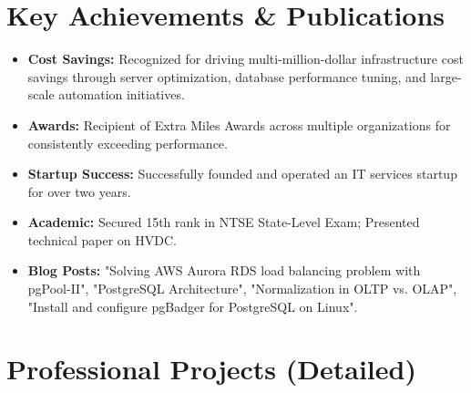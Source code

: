 \documentclass[10pt,a4paper]{article}
\begin{document}
\section{Key Achievements \& Publications}
\begin{itemize}[leftmargin=*, noitemsep]
    \item \textbf{Cost Savings:} Recognized for driving multi-million-dollar infrastructure cost savings through server optimization, database performance tuning, and large-scale automation initiatives.
    \item \textbf{Awards:} Recipient of Extra Miles Awards across multiple organizations for consistently exceeding performance.
    \item \textbf{Startup Success:} Successfully founded and operated an IT services startup for over two years.
    \item \textbf{Academic:} Secured 15th rank in NTSE State-Level Exam; Presented technical paper on HVDC.
    \item \textbf{Blog Posts:} "Solving AWS Aurora RDS load balancing problem with pgPool-II", "PostgreSQL Architecture", "Normalization in OLTP vs. OLAP", "Install and configure pgBadger for PostgreSQL on Linux".
\end{itemize}

\newpage

\section{Professional Projects (Detailed)}
\end{document}

